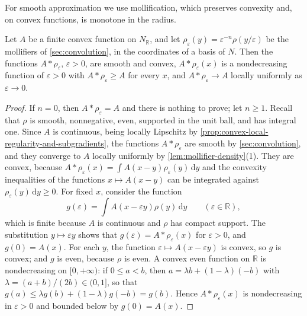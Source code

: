 For smooth approximation we use mollification, which preserves convexity and, on convex functions, is monotone in the radius.

\begin{lemma}\label{lem:convex-mollification}
Let $A$ be a finite convex function on $N_{\mathbb R}$, and let $\rho_\varepsilon(y)=\varepsilon^{-n}\rho(y/\varepsilon)$ be the mollifiers of \cref{sec:convolution}, in the coordinates of a basis of $N$. Then the functions $A*\rho_\varepsilon$, $\varepsilon>0$, are smooth and convex, $A*\rho_\varepsilon(x)$ is a nondecreasing function of $\varepsilon>0$ with $A*\rho_\varepsilon\geq A$ for every $x$, and $A*\rho_\varepsilon\to A$ locally uniformly as $\varepsilon\to0$.
\end{lemma}
\begin{proof}
If $n=0$, then $A*\rho_\varepsilon=A$ and there is nothing to prove; let $n\geq1$. Recall that $\rho$ is smooth, nonnegative, even, supported in the unit ball, and has integral one. Since $A$ is continuous, being locally Lipschitz by \cref{prop:convex-local-regularity-and-subgradients}, the functions $A*\rho_\varepsilon$ are smooth by \cref{sec:convolution}, and they converge to $A$ locally uniformly by \cref{lem:mollifier-density}(1). They are convex, because $A*\rho_\varepsilon(x)=\int A(x-y)\rho_\varepsilon(y)\,\mathrm dy$ and the convexity inequalities of the functions $x\mapsto A(x-y)$ can be integrated against $\rho_\varepsilon(y)\,\mathrm dy\geq0$. For fixed $x$, consider the function
\[
 g(\varepsilon)=\int A(x-\varepsilon y)\rho(y)\,\mathrm dy\qquad(\varepsilon\in\mathbb R),
\]
which is finite because $A$ is continuous and $\rho$ has compact support. The substitution $y\mapsto\varepsilon y$ shows that $g(\varepsilon)=A*\rho_\varepsilon(x)$ for $\varepsilon>0$, and $g(0)=A(x)$. For each $y$, the function $\varepsilon\mapsto A(x-\varepsilon y)$ is convex, so $g$ is convex; and $g$ is even, because $\rho$ is even. A convex even function on $\mathbb R$ is nondecreasing on $[0,+\infty)$: if $0\leq a<b$, then $a=\lambda b+(1-\lambda)(-b)$ with $\lambda=(a+b)/(2b)\in(0,1]$, so that $g(a)\leq\lambda g(b)+(1-\lambda)g(-b)=g(b)$. Hence $A*\rho_\varepsilon(x)$ is nondecreasing in $\varepsilon>0$ and bounded below by $g(0)=A(x)$.
\end{proof}

